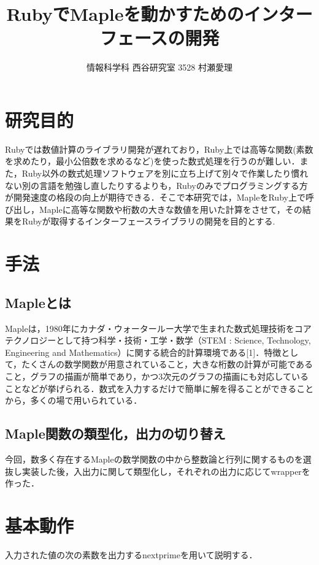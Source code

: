 \documentclass[10pt,a4j,twocolumn]{jsarticle}
\begin{document}
\title{RubyでMapleを動かすためのインターフェースの開発}
\author{情報科学科 西谷研究室 3528 村瀬愛理}
\date{}
\maketitle
\section{研究目的}
Rubyでは数値計算のライブラリ開発が遅れており，Ruby上では高等な関数(素数を求めたり，最小公倍数を求めるなど)を使った数式処理を行うのが難しい．また，Ruby以外の数式処理ソフトウェアを別に立ち上げて別々で作業したり慣れない別の言語を勉強し直したりするよりも，Rubyのみでプログラミングする方が開発速度の格段の向上が期待できる．そこで本研究では，MapleをRuby上で呼び出し，Mapleに高等な関数や桁数の大きな数値を用いた計算をさせて，その結果をRubyが取得するインターフェースライブラリの開発を目的とする.

\section{手法}
\subsection{Mapleとは}
Mapleは，1980年にカナダ・ウォータールー大学で生まれた数式処理技術をコアテクノロジーとして持つ科学・技術・工学・数学（STEM : Science, Technology, Engineering and Mathematics）に関する統合的計算環境である[1]．特徴として，たくさんの数学関数が用意されていること，大きな桁数の計算が可能であること，グラフの描画が簡単であり，かつ3次元のグラフの描画にも対応していることなどが挙げられる．数式を入力するだけで簡単に解を得ることができることから，多くの場で用いられている．

\subsection{Maple関数の類型化，出力の切り替え}
今回，数多く存在するMapleの数学関数の中から整数論と行列に関するものを選抜し実装した後，入出力に関して類型化し，それぞれの出力に応じてwrapperを作った．

\section{基本動作}
入力された値の次の素数を出力するnextprimeを用いて説明する．
\end{document}

